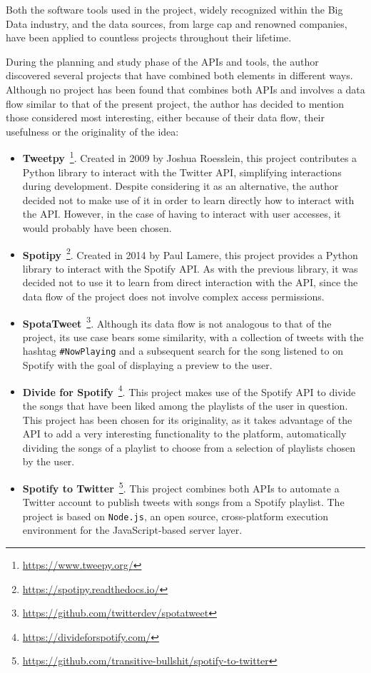 

\nonzeroparskip Both the software tools used in the project, widely recognized within the Big Data industry, and the data sources, from large cap and renowned companies, have been applied to countless projects throughout their lifetime.

\nonzeroparskip During the planning and study phase of the APIs and tools, the author discovered several projects that have combined both elements in different ways. Although no project has been found that combines both APIs and involves a data flow similar to that of the present project, the author has decided to mention those considered most interesting, either because of their data flow, their usefulness or the originality of the idea:

\begin{itemize}
	\item \textbf{Tweetpy}~\footnote{\url{https://www.tweepy.org/}}. Created in 2009 by Joshua Roesslein, this project contributes a Python library to interact with the Twitter API, simplifying interactions during development. Despite considering it as an alternative, the author decided not to make use of it in order to learn directly how to interact with the API. However, in the case of having to interact with user accesses, it would probably have been chosen.
	\item \textbf{Spotipy}~\footnote{\url{https://spotipy.readthedocs.io/}}. Created in 2014 by Paul Lamere, this project provides a Python library to interact with the Spotify API. As with the previous library, it was decided not to use it to learn from direct interaction with the API, since the data flow of the project does not involve complex access permissions.
	\item \textbf{SpotaTweet}~\footnote{\url{https://github.com/twitterdev/spotatweet}}. Although its data flow is not analogous to that of the project, its use case bears some similarity, with a collection of tweets with the hashtag \texttt{\#NowPlaying} and a subsequent search for the song listened to on Spotify with the goal of displaying a preview to the user.
	\item \textbf{Divide for Spotify}~\footnote{\url{https://divideforspotify.com/}}. This project makes use of the Spotify API to divide the songs that have been liked among the playlists of the user in question. This project has been chosen for its originality, as it takes advantage of the API to add a very interesting functionality to the platform, automatically dividing the songs of a playlist to choose from a selection of playlists chosen by the user.
	\item \textbf{Spotify to Twitter}~\footnote{\url{https://github.com/transitive-bullshit/spotify-to-twitter}}. This project combines both APIs to automate a Twitter account to publish tweets with songs from a Spotify playlist. The project is based on \texttt{Node.js}, an open source, cross-platform execution environment for the JavaScript-based server layer.
\end{itemize}

